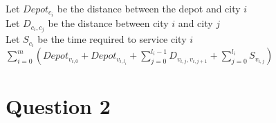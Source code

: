 \documentclass[a4paper]{article}
\begin{document}
Let $Depot_{c_{i}}$ be the distance between the depot and city $i$ \\
Let $D_{c_{i},c_{j}}$ be the distance between city $i$ and city $j$ \\
Let $S_{c_{i}}$ be the time required to service city $i$ \\

$\sum_{i=0}^{m}(Depot_{v_{i,0}} + Depot_{v_{i,l_{i}}} + \sum_{j=0}^{l_{i}-1}D_{v_{i,j},v_{i,j+1}} + \sum_{j=0}^{l_{i}}S_{v_{i,j}}) $

\section{Question 2}
\end{document}
